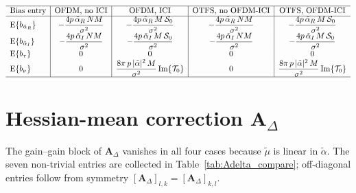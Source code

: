 \documentclass[11pt]{article}
\begin{document}
\begin{table}[h]
\centering
\renewcommand{\arraystretch}{2.4}
\(
\begin{array}{l|c|c|c|c}
\hline
\text{Bias entry} & \text{OFDM, no ICI} & \text{OFDM, ICI} & \text{OTFS, no OFDM-ICI} & \text{OTFS, OFDM-ICI} \\
\hline
\mathrm{E}\{b_{\tilde{\alpha}_R}\}
    & -\dfrac{4p\, \tilde{\alpha}_R\, NM}{\sigma^2}
    & -\dfrac{4p\, \tilde{\alpha}_R\, M\, \mathcal{S}_0}{\sigma^2}
    & -\dfrac{4p\, \tilde{\alpha}_R\, NM}{\sigma^2}
    & -\dfrac{4p\, \tilde{\alpha}_R\, M\, \mathcal{S}_0}{\sigma^2} \\
\mathrm{E}\{b_{\tilde{\alpha}_I}\}
    & -\dfrac{4p\, \tilde{\alpha}_I\, NM}{\sigma^2}
    & -\dfrac{4p\, \tilde{\alpha}_I\, M\, \mathcal{S}_0}{\sigma^2}
    & -\dfrac{4p\, \tilde{\alpha}_I\, NM}{\sigma^2}
    & -\dfrac{4p\, \tilde{\alpha}_I\, M\, \mathcal{S}_0}{\sigma^2} \\
\mathrm{E}\{b_\tau\}
    & 0 & 0 & 0 & 0 \\
\mathrm{E}\{b_\nu\}
    & 0
    & \dfrac{8\pi\, p\, |\tilde{\alpha}|^2\, M}{\sigma^2}\, \mathrm{Im}\{\mathcal{T}_0\}
    & 0
    & \dfrac{8\pi\, p\, |\tilde{\alpha}|^2\, M}{\sigma^2}\, \mathrm{Im}\{\mathcal{T}_0\} \\
\hline
\end{array}
\)
\caption{Expected single-target MCRB bias vector entries under i.i.d.\ unit-energy QPSK with BSC error rate \(p\). The kinematic entries \(b_\tau\) vanish in expectation in all four cases (the relevant moment \(\mathcal{S}_1\) or \(P_1\) is real). The Doppler entry \(b_\nu\) vanishes in the no-ICI cases (real \(Q_1\)) and picks up a small linear-in-\(p\) bias proportional to \(\mathrm{Im}\{\mathcal{T}_0\}\) in the ICI cases. The gain entries are linear in \(p\) and point along the gain vector \((\tilde{\alpha}_R, \tilde{\alpha}_I)\): bit errors mimic a real attenuation of the gain estimate by \(1-2p\). Columns 1, 3 and columns 2, 4 coincide by (I)SFFT unitarity.}
\label{tab:b_compare}
\end{table}

\section{Hessian-mean correction \texorpdfstring{\(\bm{A}_\Delta\)}{A\_Delta}}

The gain--gain block of \(\bm{A}_\Delta\) vanishes in all four cases because \(\tilde{\mu}\) is linear in \(\tilde{\alpha}\). The seven non-trivial entries are collected in Table~\ref{tab:Adelta_compare}; off-diagonal entries follow from symmetry \([\bm{A}_\Delta]_{l,k} = [\bm{A}_\Delta]_{k,l}\).
\end{document}
